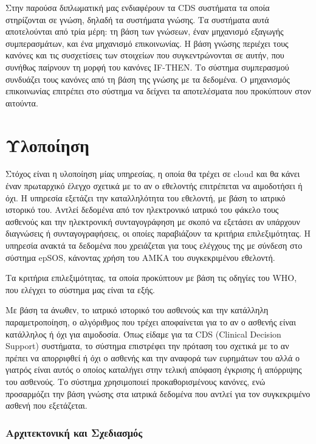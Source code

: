 		Στην παρούσα διπλωματική μας ενδιαφέρουν τα CDS συστήματα τα οποία στηρίζονται σε γνώση, δηλαδή τα συστήματα γνώσης. Τα συστήματα αυτά αποτελούνται από τρία μέρη: τη βάση των γνώσεων, έναν μηχανισμό εξαγωγής συμπερασμάτων, και ένα μηχανισμό επικοινωνίας. Η βάση γνώσης περιέχει τους κανόνες και τις συσχετίσεις των στοιχείων που συγκεντρώνονται σε αυτήν, που συνήθως παίρνουν τη μορφή του κανόνες IF-THEN. Το σύστημα συμπερασμού συνδυάζει τους κανόνες από τη βάση της γνώσης με τα δεδομένα. Ο μηχανισμός επικοινωνίας επιτρέπει στο σύστημα να δείχνει τα αποτελέσματα που προκύπτουν στον αιτούντα.
		
\section{Υλοποίηση}


		Στόχος είναι η υλοποίηση μίας υπηρεσίας, η οποία θα τρέχει σε cloud και θα κάνει έναν πρωταρχικό έλεγχο σχετικά με το αν ο εθελοντής επιτρέπεται να αιμοδοτήσει ή όχι. Η υπηρεσία εξετάζει την καταλληλότητα του εθελοντή, με βάση το ιατρικό ιστορικό του. Αντλεί δεδομένα από τον ηλεκτρονικό ιατρικό του φάκελο τους ασθενούς και την ηλεκτρονική συνταγογράφηση με σκοπό να εξετάσει αν υπάρχουν διαγνώσεις ή συνταγογραφήσεις, οι οποίες παραβιάζουν τα κριτήρια επιλεξιμότητας. Η υπηρεσία ανακτά τα δεδομένα που χρειάζεται για τους ελέγχους της με σύνδεση στο σύστημα epSOS, κάνοντας χρήση του ΑΜΚΑ του συγκεκριμένου εθελοντή.
		
		Τα κριτήρια επιλεξιμότητας, τα οποία προκύπτουν με βάση τις οδηγίες του WHO, \cite{safety} που ελέγχει το σύστημα μας είναι τα εξής.
		
		
		Με βάση τα άνωθεν, το ιατρικό ιστορικό του ασθενούς και την κατάλληλη παραμετροποίηση, ο αλγόριθμος που τρέχει αποφαίνεται για το αν ο ασθενής είναι κατάλληλος ή όχι για αιμοδοσία. Όπως είδαμε για τα CDS (Clinical Decision Support) συστήματα, το σύστημα επιστρέφει την πρόταση του σχετικά με το αν πρέπει να απορριφθεί ή όχι ο ασθενής και την αναφορά των ευρημάτων του αλλά ο γιατρός είναι αυτός ο οποίος καταλήγει στην τελική απόφαση έγκρισης ή απόρριψης του ασθενούς. Το σύστημα χρησιμοποιεί προκαθορισμένους κανόνες, ενώ προσαρμόζει την βάση γνώσης στα ιατρικά δεδομένα που αντλεί για τον συγκεκριμένο ασθενή που εξετάζεται.
	
		
	\subsubsection{Αρχιτεκτονική και Σχεδιασμός}
		
